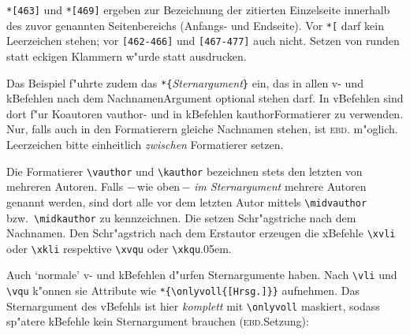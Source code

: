 \documentclass[12pt,a4paper]{article}
\begin{document}
\vspace{.5ex}\noindent
\verb|*[463]| und \verb|*[469]| ergeben \hspace{.2em}{\sffamily dort: S.} \hspace{.15em}zur Bezeichnung der 
zitierten Einzelseite innerhalb des zuvor genannten Seitenbereichs (Anfangs- und Endseite). Vor \hspace{.2em}\verb|*[| \hspace{.2em}darf kein Leerzeichen stehen; vor 
\hspace{.15em}\verb|[462-466]| \hspace{.15em}und \hspace{.15em}\verb|[467-477]| \hspace{.15em}auch nicht. Setzen
von runden statt eckigen Klammern w"urde \hspace{.2em}{\sffamily Bl.} \hspace{.15em}statt \hspace{.2em}{\sffamily S.} \hspace{.15em}ausdrucken.

Das Beispiel f"uhrte zudem das \verb|*{|\textit{Sternargument}\verb|}| ein, 
das in allen v- und k\hy Befehlen nach dem Nachnamen\hy Argument optional
stehen darf. In v\fhy Befehlen sind dort f"ur Koautoren vauthor- und in 
k\fhy Befehlen kauthor\fhy Formatierer zu verwenden. Nur, falls auch in den 
Formatierern gleiche Nachnamen stehen, ist
\textsc{ebd.} m"oglich. Leerzeichen bitte einheitlich \textit{zwischen} 
Formatierer setzen.

Die Formatierer \verb|\vauthor| und \verb|\kauthor| bezeichnen stets 
den letzten von mehreren Autoren. Falls $-$\,wie oben\,$-$ \textit{im Sternargument} 
mehrere Autoren genannt werden, sind dort alle vor dem letzten Autor mittels
\hspace{-.05em}\verb|\midvauthor| bzw.\ \hspace{-.05em}\verb|\midkauthor| zu 
kennzeichnen. Die setzen Schr"agstriche nach dem Nachnamen. Den Schr"agstrich 
nach dem Erstautor erzeugen die x\fhy Befehle \hspace{-.05em}\verb|\xvli| oder 
\verb|\xkli| respektive \hspace{-.05em}\verb|\xvqu| \hspace{.05em}oder 
\verb|\xkqu|\kern.05em. 

Auch `normale' v- und k\fhy Befehlen d"urfen Sternargumente haben.
Nach \verb|\vli| und \verb|\vqu| k"onnen sie Attribute wie 
\verb|*{\onlyvoll{[Hrsg.]}}| aufnehmen. Das Sternargument 
des v\fhy Befehls ist hier \textit{komplett} mit \verb|\onlyvoll| maskiert, sodass sp"atere 
k\fhy Befehle kein Sternargument brauchen (\textsc{ebd.}\hy Setzung):
\end{document}
